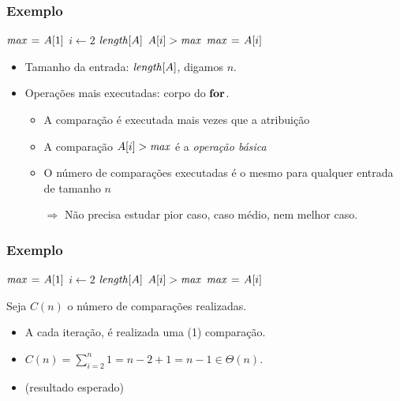 \documentclass[handout]{beamer}
\begin{document}
\begin{frame}
  \frametitle{Exemplo}

\begin{small}
\begin{codebox}
\li $\id{max} \gets A[1]$
\li \For $i \gets 2$ \To $\id{length}[A]$
\li \Do
\li   \If $A[i] > \id{max}$
\li   \Then
        $\id{max} \gets A[i]$
      \End    
    \End    
\end{codebox}
\end{small}

\begin{itemize}
\item Tamanho da entrada: $\id{length}[A]$, digamos $n$.
\item Operações mais executadas: corpo do $\textbf{for}$.
  \begin{itemize}
    \item A comparação é executada mais vezes que a atribuição
    \item A comparação $A[i] > \id{max}$ é a \emph{operação básica}
    \item O número de comparações
      executadas é o mesmo para
      qualquer entrada de tamanho
      $n$
      
      \alert{$\Longrightarrow$}
      Não precisa estudar pior caso, caso médio, nem melhor caso.
  \end{itemize}
  \end{itemize}
\end{frame}


\begin{frame}
  \frametitle{Exemplo}

\begin{small}
\begin{codebox}
\li $\id{max} \gets A[1]$
\li \For $i \gets 2$ \To $\id{length}[A]$
\li \Do
\li   \If $A[i] > \id{max}$
\li   \Then
        $\id{max} \gets A[i]$
      \End    
    \End    
\end{codebox}
\end{small}

Seja $C(n)$ o número de comparações realizadas.
\begin{itemize}
\item A cada iteração, é realizada uma (1) comparação.
\item $C(n) = \sum_{i=2}^{n} 1 = n - 2 + 1 = n - 1 \in \Theta(n) $.
\item (resultado esperado)
\end{itemize}
\end{frame}
\end{document}

